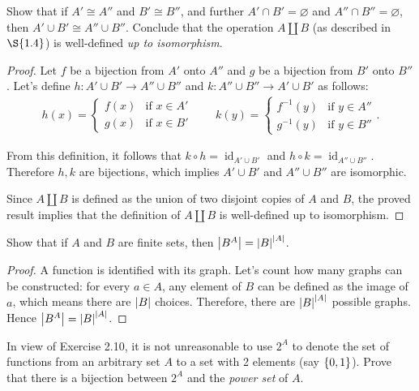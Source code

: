 \begin{exercise}{2.9}
	Show that if $A'\cong A''$ and $B'\cong B''$, and further $A'\cap B' = \varnothing$ and $A''\cap B'' = \varnothing$, then $A'\cup B' \cong A''\cup B''$. Conclude that the operation $A\coprod B$ (as described in $\S{1.4}$) is well-defined \textit{up to isomorphism}.
\end{exercise}

\begin{proof}
	Let $f$ be a bijection from $A'$ onto $A''$ and $g$ be a bijection from $B'$ onto $B''$. Let's define $h: A'\cup B' \to A''\cup B''$ and $k: A''\cup B''\to A'\cup B'$ as follows:
	\begin{align*}
		h(x) = \begin{cases}
			       f(x) & \text{if $x\in A'$} \\
			       g(x) & \text{if $x\in B'$}
		       \end{cases}
		\qquad
		k(y) = \begin{cases}
			       f^{-1}(y) & \text{if $y\in A''$} \\
			       g^{-1}(y) & \text{if $y\in B''$}
		       \end{cases}.
	\end{align*}

	From this definition, it follows that $k\circ h = \operatorname{id}_{A'\cup B'}$ and $h\circ k = \operatorname{id}_{A''\cup B''}$. Therefore $h, k$ are bijections, which implies $A'\cup B'$ and $A''\cup B''$ are isomorphic.

	Since $A\coprod B$ is defined as the union of two disjoint copies of $A$ and $B$, the proved result implies that the definition of $A\coprod B$ is well-defined up to isomorphism.
\end{proof}

\begin{exercise}{2.10}
	Show that if $A$ and $B$ are finite sets, then $\left\vert{B^{A}}\right\vert = {\left\vert{B}\right\vert}^{\left\vert{A}\right\vert}$.
\end{exercise}

\begin{proof}
	A function is identified with its graph. Let's count how many graphs can be constructed: for every $a\in A$, any element of $B$ can be defined as the image of $a$, which means there are $\left\vert{B}\right\vert$ choices. Therefore, there are ${\left\vert{B}\right\vert}^{\left\vert{A}\right\vert}$ possible graphs. Hence $\left\vert{B^{A}}\right\vert = {\left\vert{B}\right\vert}^{\left\vert{A}\right\vert}$.
\end{proof}

\begin{exercise}{2.11}
	In view of Exercise 2.10, it is not unreasonable to use $2^{A}$ to denote the set of functions from an arbitrary set $A$ to a set with 2 elements (say $\left\{{0, 1}\right\}$). Prove that there is a bijection between $2^{A}$ and the \textit{power set} of $A$.
\end{exercise}

